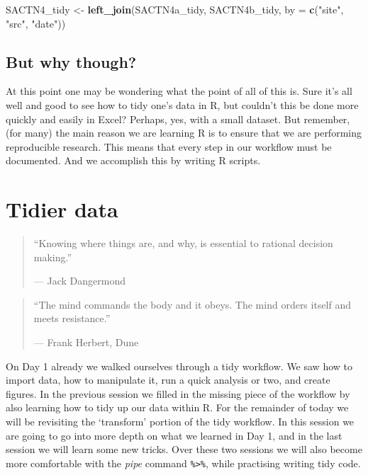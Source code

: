 \documentclass[]{book}
\newenvironment{Shaded}{\begin{snugshade}}{\end{snugshade}}
\newcommand{\KeywordTok}[1]{\textcolor[rgb]{0.13,0.29,0.53}{\textbf{#1}}}
\newcommand{\DataTypeTok}[1]{\textcolor[rgb]{0.13,0.29,0.53}{#1}}
\newcommand{\StringTok}[1]{\textcolor[rgb]{0.31,0.60,0.02}{#1}}
\newcommand{\NormalTok}[1]{#1}
\theoremstyle{definition}
\theoremstyle{definition}
\theoremstyle{definition}
\theoremstyle{remark}
\begin{document}
\begin{Shaded}
\begin{Highlighting}[]
\NormalTok{SACTN4_tidy <-}\StringTok{ }\KeywordTok{left_join}\NormalTok{(SACTN4a_tidy, SACTN4b_tidy, }\DataTypeTok{by =} \KeywordTok{c}\NormalTok{(}\StringTok{"site"}\NormalTok{, }\StringTok{"src"}\NormalTok{, }\StringTok{"date"}\NormalTok{))}
\end{Highlighting}
\end{Shaded}

\section{But why though?}\label{but-why-though}

At this point one may be wondering what the point of all of this is.
Sure it's all well and good to see how to tidy one's data in R, but
couldn't this be done more quickly and easily in Excel? Perhaps, yes,
with a small dataset. But remember, (for many) the main reason we are
learning R is to ensure that we are performing reproducible research.
This means that every step in our workflow must be documented. And we
accomplish this by writing R scripts.

\chapter{Tidier data}\label{tidier}

\begin{quote}
``Knowing where things are, and why, is essential to rational decision
making.''

--- Jack Dangermond
\end{quote}

\begin{quote}
``The mind commands the body and it obeys. The mind orders itself and
meets resistance.''

--- Frank Herbert, Dune
\end{quote}

On Day 1 already we walked ourselves through a tidy workflow. We saw how
to import data, how to manipulate it, run a quick analysis or two, and
create figures. In the previous session we filled in the missing piece
of the workflow by also learning how to tidy up our data within R. For
the remainder of today we will be revisiting the `transform' portion of
the tidy workflow. In this session we are going to go into more depth on
what we learned in Day 1, and in the last session we will learn some new
tricks. Over these two sessions we will also become more comfortable
with the \emph{pipe} command \texttt{\%\textgreater{}\%}, while
practising writing tidy code.
\end{document}
